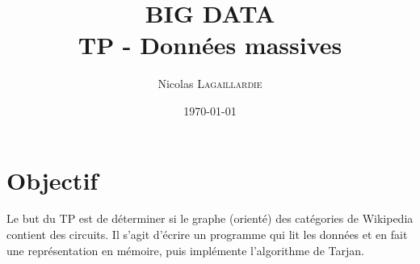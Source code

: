 \documentclass{article}
\title{BIG DATA \\ TP - Donn\'{e}es massives} %
\author{Nicolas \textsc{Lagaillardie}} %
\date{\today} %
\begin{document}
\maketitle %




\section{Objectif}

Le but du TP est de d\'{e}terminer si le graphe (orient\'{e}) des cat\'{e}gories de Wikipedia contient des circuits. Il s’agit d’\'{e}crire un programme qui lit les donn\'{e}es et en fait une repr\'{e}sentation en m\'{e}moire, puis impl\'{e}mente l'algorithme de Tarjan.


\end{document}
